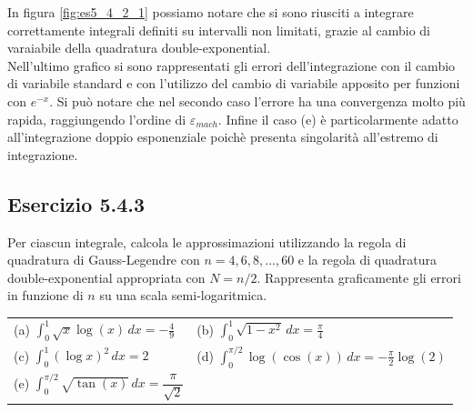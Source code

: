 \documentclass[letterpaper, 12pt]{article}
\numberwithin{equation}{section}    %
\begin{document}
In figura \ref{fig:es5_4_2_1} possiamo notare che si sono riusciti a integrare correttamente integrali
definiti su intervalli non limitati, grazie al cambio di varaiabile della quadratura double-exponential. \\
Nell'ultimo grafico si sono rappresentati gli errori dell'integrazione con il cambio di variabile standard e 
con l'utilizzo del cambio di variabile apposito per funzioni con $e^{-x}$. Si può notare che nel secondo caso 
l'errore ha una convergenza molto più rapida, raggiungendo l'ordine di $\varepsilon_{mach}$. Infine il caso
(e) è particolarmente adatto all'integrazione doppio esponenziale poichè presenta singolarità all'estremo di 
integrazione.

\newpage

\subsection{Esercizio 5.4.3}
Per ciascun integrale, calcola le approssimazioni utilizzando la regola di quadratura di Gauss-Legendre 
con $n=4,6,8,\ldots,60$ e la regola di quadratura double-exponential appropriata con $N=n/2$. 
Rappresenta graficamente gli errori in funzione di $n$ su una scala semi-logaritmica.

\begin{tabular}{@{}ll@{}}
(a) $\displaystyle \int_0^1 \sqrt{x} \log(x) \, dx = -\frac{4}{9}$
    & (b) $\displaystyle \int_0^1 \sqrt{1-x^2}\, dx = \frac{\pi}{4}$ \\[1.5ex]
(c) $\displaystyle \int_0^1 (\log x)^2\, dx = 2$
    & (d) $\displaystyle \int_0^{\pi/2} \log(\cos(x))\, dx = -\frac{\pi}{2}\log(2)$ \\[1.5ex]
(e) $\displaystyle \int_0^{\pi/2} \sqrt{\tan(x)}\, dx = \dfrac{\pi}{\sqrt{2}}$ & \\
\end{tabular}
\end{document}
